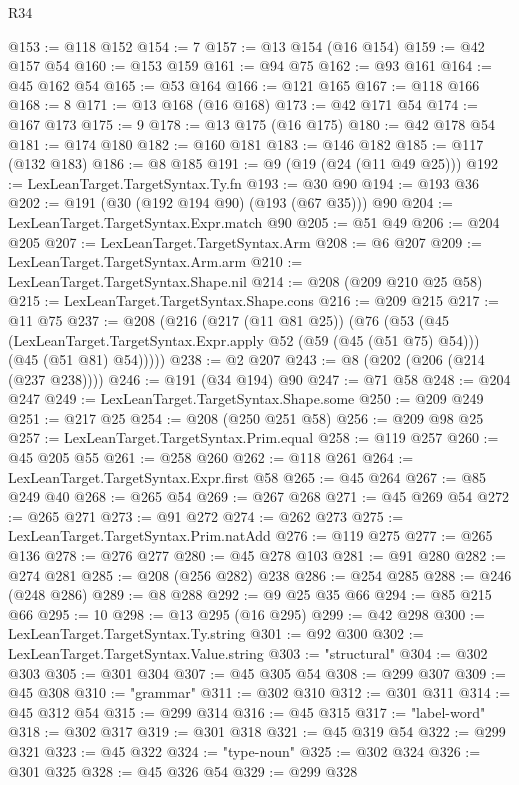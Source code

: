 \begin{lexlean}{R34}
\begin{coremodule}
@153 := @118 @152
@154 := 7
@157 := @13 @154 (@16 @154)
@159 := @42 @157 @54
@160 := @153 @159
@161 := @94 @75
@162 := @93 @161
@164 := @45 @162 @54
@165 := @53 @164
@166 := @121 @165
@167 := @118 @166
@168 := 8
@171 := @13 @168 (@16 @168)
@173 := @42 @171 @54
@174 := @167 @173
@175 := 9
@178 := @13 @175 (@16 @175)
@180 := @42 @178 @54
@181 := @174 @180
@182 := @160 @181
@183 := @146 @182
@185 := @117 (@132 @183)
@186 := @8 @185
@191 := @9 (@19 (@24 (@11 @49 @25)))
@192 := LexLeanTarget.TargetSyntax.Ty.fn
@193 := @30 @90
@194 := @193 @36
@202 := @191 (@30 (@192 @194 @90) (@193 (@67 @35))) @90
@204 := LexLeanTarget.TargetSyntax.Expr.match @90
@205 := @51 @49
@206 := @204 @205
@207 := LexLeanTarget.TargetSyntax.Arm
@208 := @6 @207
@209 := LexLeanTarget.TargetSyntax.Arm.arm
@210 := LexLeanTarget.TargetSyntax.Shape.nil
@214 := @208 (@209 @210 @25 @58)
@215 := LexLeanTarget.TargetSyntax.Shape.cons
@216 := @209 @215
@217 := @11 @75
@237 := @208
    (@216
      (@217 (@11 @81 @25))
      (@76
        (@53
          (@45
            (LexLeanTarget.TargetSyntax.Expr.apply @52 (@59 (@45 (@51 @75) @54)))
            (@45 (@51 @81) @54)))))
@238 := @2 @207
@243 := @8 (@202 (@206 (@214 (@237 @238))))
@246 := @191 (@34 @194) @90
@247 := @71 @58
@248 := @204 @247
@249 := LexLeanTarget.TargetSyntax.Shape.some
@250 := @209 @249
@251 := @217 @25
@254 := @208 (@250 @251 @58)
@256 := @209 @98 @25
@257 := LexLeanTarget.TargetSyntax.Prim.equal
@258 := @119 @257
@260 := @45 @205 @55
@261 := @258 @260
@262 := @118 @261
@264 := LexLeanTarget.TargetSyntax.Expr.first @58
@265 := @45 @264
@267 := @85 @249 @40
@268 := @265 @54
@269 := @267 @268
@271 := @45 @269 @54
@272 := @265 @271
@273 := @91 @272
@274 := @262 @273
@275 := LexLeanTarget.TargetSyntax.Prim.natAdd
@276 := @119 @275
@277 := @265 @136
@278 := @276 @277
@280 := @45 @278 @103
@281 := @91 @280
@282 := @274 @281
@285 := @208 (@256 @282) @238
@286 := @254 @285
@288 := @246 (@248 @286)
@289 := @8 @288
@292 := @9 @25 @35 @66
@294 := @85 @215 @66
@295 := 10
@298 := @13 @295 (@16 @295)
@299 := @42 @298
@300 := LexLeanTarget.TargetSyntax.Ty.string
@301 := @92 @300
@302 := LexLeanTarget.TargetSyntax.Value.string
@303 := "structural"
@304 := @302 @303
@305 := @301 @304
@307 := @45 @305 @54
@308 := @299 @307
@309 := @45 @308
@310 := "grammar"
@311 := @302 @310
@312 := @301 @311
@314 := @45 @312 @54
@315 := @299 @314
@316 := @45 @315
@317 := "label-word"
@318 := @302 @317
@319 := @301 @318
@321 := @45 @319 @54
@322 := @299 @321
@323 := @45 @322
@324 := "type-noun"
@325 := @302 @324
@326 := @301 @325
@328 := @45 @326 @54
@329 := @299 @328

\end{coremodule}
\end{lexlean}
